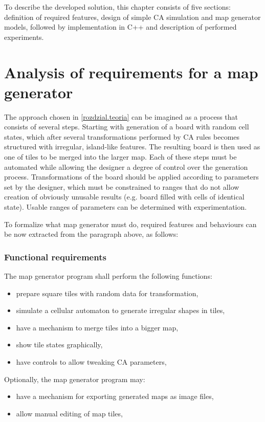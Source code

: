 \documentclass[12pt]{report}
\begin{document}
To describe the developed solution, this chapter consists of five sections: definition of required features, design of simple CA simulation and map generator models, followed by implementation in C++ and description of performed experiments. 

\section{Analysis of requirements for a map generator}

The approach chosen in \cref{rozdzial.teoria} can be imagined as a process that consists of several steps. Starting with generation of a board with random cell states, which after several transformations performed by CA rules becomes structured with irregular, island-like features. The resulting board is then used as one of tiles to be merged into the larger map. Each of these steps must be automated while allowing the designer a degree of control over the generation process. Transformations of the board should be applied according to parameters set by the designer, which must be constrained to ranges that do not allow creation of obviously unusable results (e.g. board filled with cells of identical state). Usable ranges of parameters can be determined with experimentation.

To formalize what map generator must do, required features and behaviours can be now extracted from the paragraph above, as follows:
 
\subsubsection{Functional requirements}

The map generator program shall perform the following functions:
\begin{itemize}
	\item prepare square tiles with random data for transformation,
	\item simulate a cellular automaton to generate irregular shapes in tiles,
	\item have a mechanism to merge tiles into a bigger map,
	\item show tile states graphically,
	\item have controls to allow tweaking CA parameters,
\end{itemize}

Optionally, the map generator program may:
\begin{itemize}
	\item have a mechanism for exporting generated maps as image files,
	\item allow manual editing of map tiles, 
\end{itemize}
\end{document}
